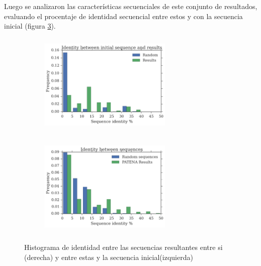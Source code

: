 Luego se analizaron las características secuenciales de este conjunto de resultados, evaluando el procentaje de identidad secuencial entre estos y con la secuencia inicial (figura \ref{fig:identity}). 




\begin{figure}[htbp]
  \begin{subfigure}[b]{200px}
  \includegraphics[width=240px,height=185px]{img/resultados/againstInitial-random.png}
    \label{fig:identity-a}
  \end{subfigure}
  \hspace{30px}
  \begin{subfigure}[b]{200px}
    \includegraphics[width=240px,height=185px]{img/resultados/againstAll-random.png}
    \label{fig:identity-b}
  \end{subfigure}
  \caption{Histograma de identidad entre las secuencias resultantes entre si (derecha) y entre estas y la secuencia inicial(izquierda)}
  \label{fig:identity}
\end{figure}




